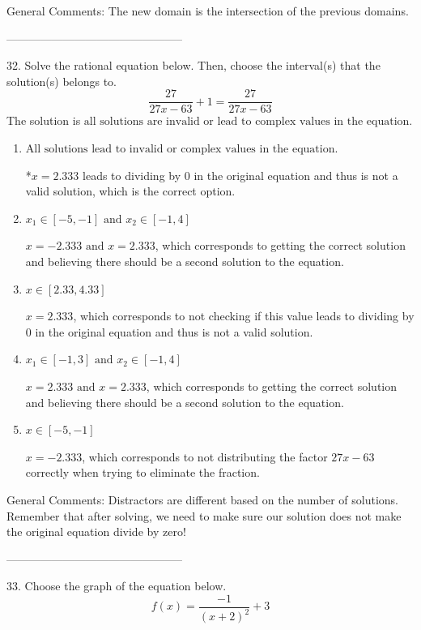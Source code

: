 \documentclass{article}[14pt]
\begin{document}
General Comments: The new domain is the intersection of the previous domains.

-----------------------------------------------

32. Solve the rational equation below. Then, choose the interval(s) that the solution(s) belongs to.
$$ \frac{27}{27x -63} + 1 = \frac{27}{27x -63} $$ 
The solution is $ \text{all solutions are invalid or lead to complex values in the equation.} $ 

\begin{enumerate}[label=\Alph*.] 
\item $ \text{All solutions lead to invalid or complex values in the equation.} $ 

 *$x = 2.333$ leads to dividing by 0 in the original equation and thus is not a valid solution, which is the correct option. 
\item $ x_1 \in [-5, -1] \text{ and } x_2 \in [-1,4] $ 

 $x = -2.333 \text{ and } x = 2.333$, which corresponds to getting the correct solution and believing there should be a second solution to the equation. 
\item $ x \in [2.33,4.33] $ 

 $x = 2.333$, which corresponds to not checking if this value leads to dividing by 0 in the original equation and thus is not a valid solution. 
\item $ x_1 \in [-1, 3] \text{ and } x_2 \in [-1,4] $ 

 $x = 2.333 \text{ and } x = 2.333$, which corresponds to getting the correct solution and believing there should be a second solution to the equation. 
\item $ x \in [-5,-1] $ 

 $x = -2.333$, which corresponds to not distributing the factor $27x -63$ correctly when trying to eliminate the fraction. 
\end{enumerate} 
 
General Comments: Distractors are different based on the number of solutions. Remember that after solving, we need to make sure our solution does not make the original equation divide by zero!

-----------------------------------------------

33. Choose the graph of the equation below.
$$ f(x) = \frac{-1}{(x + 2)^2} + 3 $$ 
\end{document}
